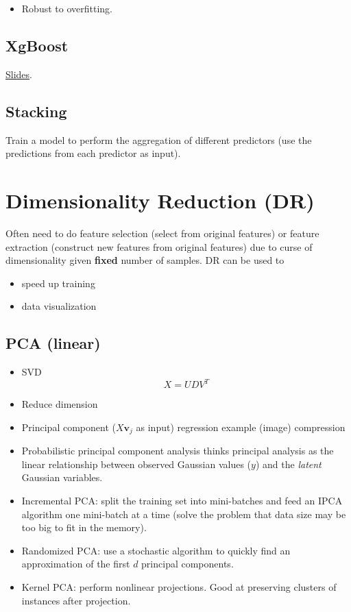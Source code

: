 \documentclass[12pt,oneside,a4paper]{article}
\numberwithin{equation}{section}
\begin{document}
\begin{itemize}
\item Robust to overfitting.
\end{itemize}

\subsection{XgBoost}

\href{https://homes.cs.washington.edu/~tqchen/pdf/BoostedTree.pdf}{Slides}.
\subsection{Stacking}
Train a model to perform the aggregation of different predictors (use the predictions from each predictor as input).
\section{Dimensionality Reduction (DR)}
Often need to do feature selection (select from original features) or feature extraction (construct new features from original features) due to curse of dimensionality given \textbf{fixed} number of samples.
DR can be used to 
\begin{itemize}
\item speed up training
\item data visualization
\end{itemize}

\subsection{PCA (linear)}
\begin{itemize}
\item SVD 
\begin{equation}
X = UDV^T
\end{equation}

\item Reduce dimension 
\item Principal component ($X\boldsymbol{v}_j$ as input) regression example (image) compression
\item Probabilistic principal component analysis thinks principal analysis as the linear relationship between observed Gaussian values ($y$) and the \emph{latent} Gaussian variables. 
\item Incremental PCA: split the training set into mini-batches and feed an IPCA algorithm one mini-batch at a time (solve the problem that data size may be too big to fit in the memory).
\item Randomized PCA: use a stochastic algorithm to quickly find an approximation of the first $d$ principal components. 
\item Kernel PCA: perform nonlinear projections. Good at preserving clusters of instances after projection. 
\end{itemize}
\end{document}

